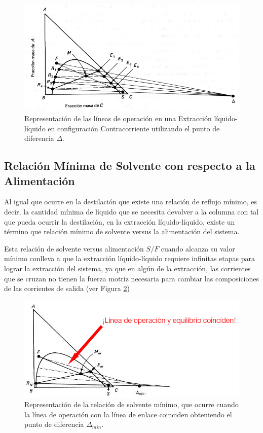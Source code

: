 \documentclass[11pt]{book}
\begin{document}
\begin{figure}[H]
    \centering
    \includegraphics{img/LiquidoLiquido/ExtraccionLiqLiq_ContraCorriente_6.PNG}
    \caption{Representación de las líneas de operación en una Extracción líquido-líquido en configuración Contracorriente utilizando el punto de diferencia $\Delta$.}
    \label{fig:ExtraccionLiqLiqContraCorriente_6}
\end{figure}

\subsection{Relación Mínima de Solvente con respecto a la Alimentación}

Al igual que ocurre en la destilación que existe una relación de reflujo mínimo, es decir, la cantidad mínima de líquido que se necesita devolver a la columna con tal que pueda ocurrir la destilación, en la extracción líquido-líquido, existe un término que relación mínimo de solvente versus la alimentación del sistema. 

Esta relación de solvente versus alimentación $S/F$ cuando alcanza su valor mínimo conlleva a que la extracción líquido-líquido requiere infinitas etapas para lograr la extracción del sistema, ya que en algún de la extracción, las corrientes que se cruzan no tienen la fuerza motriz necesaria para cambiar las composiciones de las corrientes de salida (ver Figura \ref{fig:ExtraccionLiqLiqContraCorriente_7})

\begin{figure}[H]
    \centering
    \includegraphics{img/LiquidoLiquido/ExtraccionLiqLiq_ContraCorriente_7.PNG}
    \caption{Representación de la relación de solvente mínimo, que ocurre cuando la línea de operación con la línea de enlace coinciden obteniendo el punto de diferencia $\Delta_{min}$.}
    \label{fig:ExtraccionLiqLiqContraCorriente_7}
\end{figure}
\end{document}
